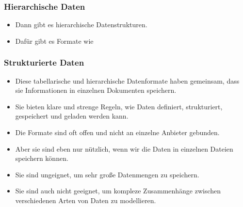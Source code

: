 \documentclass[aspectratio=169,mathserif,notheorems]{beamer}%
\begin{document}
%
%
\begin{frame}[t]%
\frametitle{Hierarchische Daten}%
\begin{itemize}%
\item Dann gibt es hierarchische Datenstrukturen.%
\item<2-> Dafür gibt es Formate wie \cite{BPSMM2008EMLX1FE,K2019ITXJY,CH2013XFCAMLTMC}%
\end{itemize}%
%
%
%
%
%
%
%
%
%
\end{frame}%
%
%
\begin{frame}[t]%
\frametitle{Strukturierte Daten}%
\begin{itemize}%
\item Diese tabellarische und hierarchische Datenformate haben gemeinsam, dass sie Informationen in einzelnen Dokumenten speichern.%
\item<2-> Sie bieten klare und strenge Regeln, wie Daten definiert, strukturiert, gespeichert und geladen werden kann.%
\item<3-> Die Formate sind oft offen und nicht an einzelne Anbieter gebunden.%
\item<4-> Aber sie sind eben nur nützlich, wenn wir die Daten in einzelnen Dateien speichern können.%
\item<5-> Sie sind ungeignet, um sehr große Datenmengen zu speichern.%
\item<6-> Sie sind auch nicht geeignet, um kompleze Zusammenhänge zwischen verschiedenen Arten von Daten zu modellieren.%
\end{itemize}%
\end{frame}%
%
%
\end{document}
